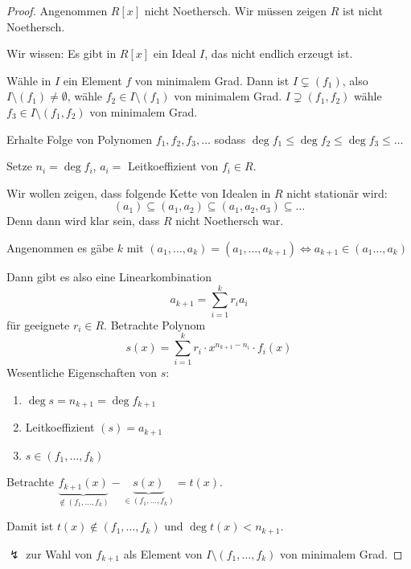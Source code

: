 \documentclass[a4paper,12pt,numbers=noenddot,parskip=full]{scrartcl}
\theoremstyle{dotless}
\theoremstyle{remark}
\begin{document}
	\begin{proof}
		Angenommen $R[x]$ nicht Noethersch. Wir müssen zeigen $R$ ist nicht Noethersch.
		
		Wir wissen: Es gibt in $R[x]$ ein Ideal $I$, das nicht endlich erzeugt ist.
		
		Wähle in $I$ ein Element $f$ von minimalem Grad. Dann ist $I \subsetneq (f_1)$, also $I \setminus (f_1) \neq \emptyset$, wähle $f_2 \in I \setminus (f_1)$ von minimalem Grad. $I \supsetneq (f_1, f_2)$ wähle $f_3 \in I \setminus (f_1, f_2)$ von minimalem Grad.
		
		Erhalte Folge von Polynomen $f_1, f_2, f_3, \dots$ sodass $\deg f_1 \leq \deg f_2 \leq \deg f_3 \leq \dots$
		
		Setze $n_i = \deg f_i$, $a_i = $ Leitkoeffizient von $f_i \in R$.
		
		Wir wollen zeigen, dass folgende Kette von Idealen in $R$ nicht stationär wird:
		\begin{equation*}
			(a_1) \subseteq (a_1, a_2) \subseteq (a_1, a_2, a_3) \subseteq \dots
		\end{equation*}
		Denn dann wird klar sein, dass $R$ nicht Noethersch war.
		
		Angenommen es gäbe $k$ mit $(a_1, \dots, a_k) = (a_1, \dots, a_{k+1}) \Leftrightarrow a_{k+1} \in (a_1 \dots, a_k)$
		
		Dann gibt es also eine Linearkombination
		\begin{equation*}
			a_{k+1} = \sum_{i = 1}^k r_i a_i
		\end{equation*}
		für geeignete $r_i \in R$. Betrachte Polynom
		\begin{equation*}
			s(x) = \sum_{i = 1}^k r_i \cdot x^{n_{k+1} - n_i} \cdot f_i(x)
		\end{equation*}
		Wesentliche Eigenschaften von $s$:
		\begin{enumerate}
			\item $\deg s = n_{k+1} = \deg f_{k+1}$
			\item Leitkoeffizient $(s) = a_{k+1}$
			\item $s \in (f_1, \dots, f_k)$
		\end{enumerate}
	
		Betrachte $\underbrace{f_{k+1}(x)}_{\notin (f_1, \dots, f_k)} - \underbrace{s(x)}_{\in (f_1, \dots, f_k)} = t(x)$.
		
		Damit ist $t(x) \notin (f_1, \dots, f_k)$ und $\deg t(x) < n_{k+1}$.
		
		$\lightning$ zur Wahl von $f_{k+1}$ als Element von $I \setminus (f_1, \dots, f_k)$ von minimalem Grad.
	\end{proof}
\end{document}
